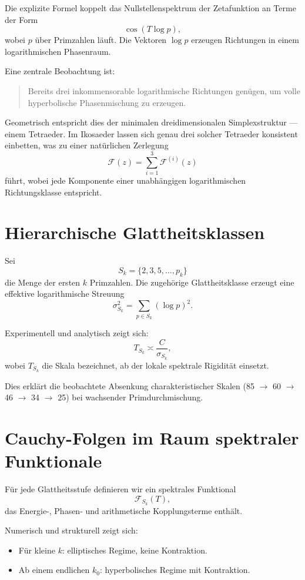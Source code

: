 \documentclass[11pt,a4paper]{article}
\begin{document}
Die explizite Formel koppelt das Nullstellenspektrum der Zetafunktion an Terme der Form
\[
\cos(T\log p),
\]
wobei $p$ über Primzahlen läuft.
Die Vektoren $\log p$ erzeugen Richtungen in einem logarithmischen Phasenraum.

Eine zentrale Beobachtung ist:
\begin{quote}
Bereits drei inkommensorable logarithmische Richtungen genügen, um volle hyperbolische Phasenmischung zu erzeugen.
\end{quote}

Geometrisch entspricht dies der minimalen dreidimensionalen Simplexstruktur --- einem Tetraeder.
Im Ikosaeder lassen sich genau drei solcher Tetraeder konsistent einbetten, was zu einer natürlichen Zerlegung
\[
\mathcal F(z)=\sum_{i=1}^3 \mathcal F^{(i)}(z)
\]
führt, wobei jede Komponente einer unabhängigen logarithmischen Richtungsklasse entspricht.

\section{Hierarchische Glattheitsklassen}

Sei
\[
S_k=\{2,3,5,\dots,p_k\}
\]
die Menge der ersten $k$ Primzahlen.
Die zugehörige Glattheitsklasse erzeugt eine effektive logarithmische Streuung
\[
\sigma_{S_k}^2=\sum_{p\in S_k}(\log p)^2.
\]

Experimentell und analytisch zeigt sich:
\[
T_{S_k}\asymp \frac{C}{\sigma_{S_k}},
\]
wobei $T_{S_k}$ die Skala bezeichnet, ab der lokale spektrale Rigidität einsetzt.

Dies erklärt die beobachtete Absenkung charakteristischer Skalen
(85 $\to$ 60 $\to$ 46 $\to$ 34 $\to$ 25) bei wachsender Primdurchmischung.

\section{Cauchy-Folgen im Raum spektraler Funktionale}

Für jede Glattheitsstufe definieren wir ein spektrales Funktional
\[
\mathcal F_{S_k}(T),
\]
das Energie-, Phasen- und arithmetische Kopplungsterme enthält.

Numerisch und strukturell zeigt sich:
\begin{itemize}
\item Für kleine $k$: elliptisches Regime, keine Kontraktion.
\item Ab einem endlichen $k_0$: hyperbolisches Regime mit Kontraktion.
\end{itemize}
\end{document}
